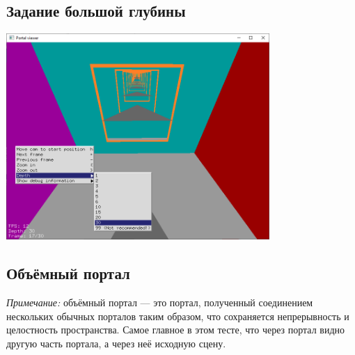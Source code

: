 \subsection{Задание большой глубины}

\begin{center}
\includegraphics[width=0.75\textwidth]{img/6.png}
\end{center}

\subsection{Объёмный портал}

\textit{Примечание:} объёмный портал --- это портал, полученный соединением нескольких обычных порталов таким образом, что сохраняется непрерывность и целостность пространства. Самое главное в этом тесте, что через портал видно другую часть портала, а через неё исходную сцену.

